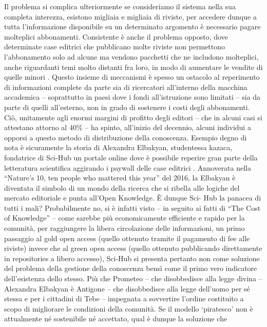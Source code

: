 Il problema si complica ulteriormente se consideriamo il sistema nella sua completa
interezza, esistono migliaia e migliaia di riviste, per accedere dunque a tutta l’informazione
disponibile su un determinato argomento è necessario pagare molteplici abbonamenti.
Consistente è anche il problema opposto, dove determinate case editrici che pubblicano
molte riviste non permettono l’abbonamento solo ad alcune ma vendono pacchetti che ne
includono molteplici, anche riguardanti temi molto distanti fra loro, in modo di aumentare le
vendite di quelle minori \parencite{jeon}. Questo insieme di meccanismi è spesso
un ostacolo al reperimento di informazioni complete da parte sia di ricercatori all’interno
della macchina accademica – soprattutto in paesi dove i fondi all’istruzione sono limitati – sia
da parte di quelli all’esterno, non in grado di sostenere i costi degli abbonamenti. Ciò,
unitamente agli enormi margini di profitto degli editori \parencite{lariviere} – che in alcuni
casi si attestano attorno al 40\% – ha spinto, all’inizio del decennio, alcuni individui a opporsi
a questo metodo di distribuzione della conoscenza. Esempio degno di nota è sicuramente
la storia di Alexandra Elbakyan, studentessa kazaca, fondatrice di Sci-Hub un portale online
dove è possibile reperire gran parte della letteratura scientifica aggirando i paywall delle
case editrici \parencite{himmelstein}. Annoverata nella “Nature’s 10, ten people who
mattered this year” del 2016, la Elbakyan è diventata il simbolo di un mondo della ricerca
che si ribella alle logiche del mercato editoriale e punta all’Open Knowledge. È dunque Sci-
Hub la panacea di tutti i mali? Probabilmente no, si è infatti visto – in seguito ai fatti di “The
Cost of Knowledge” – come sarebbe più economicamente efficiente e rapido per la
comunità, per raggiungere la libera circolazione delle informazioni, un primo passaggio al
gold open access (quello ottenuto tramite il pagamento di fee alle riviste) invece che al green
open access (quello ottenuto pubblicando direttamente in repositories a libero
accesso)\parencite{suber}, Sci-Hub si presenta pertanto non come soluzione del problema della
gestione della conoscenza bensì come il primo vero indicatore dell’esistenza dello stesso.
Più che Prometeo – che disobbedisce alla legge divina – Alexandra Elbakyan è Antigone –
che disobbedisce alla legge dell’uomo per sé stessa e per i cittadini di Tebe – impegnata a
sovvertire l’ordine costituito a scopo di migliorare le condizioni della comunità. Se il modello
‘piratesco’ non è attualmente né sostenibile né accettato, qual è dunque la soluzione che
